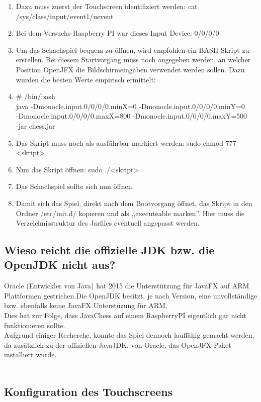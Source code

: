\documentclass[12pt,a4paper]{article}
\begin{document}
{\begin{enumerate}
	\item{Dazu muss zuerst der Touchscreen identifiziert werden: cat /sys/class/input/event1/uevent}
	\item{Bei dem Versuchs-Raspberry PI war dieses Input Device: 0/0/0/0}
	\item{Um das Schachspiel bequem zu öffnen, wird empfohlen ein BASH-Skript zu erstellen. Bei diesem Startvorgang muss noch angegeben werden, an welcher Position OpenJFX die Bildschirmeingaben verwendet werden sollen. Dazu wurden die besten Werte empirisch ermittelt:}
	\item{\# /bin/bash \\
	java -Dmonocle.input.0/0/0/0.minX=0 -Dmonocle.input.0/0/0/0.minY=0 \\
	-Dmonocle.input.0/0/0/0.maxX=800 -Dmonocle.input.0/0/0/0.maxY=500 \\
	-jar chess.jar
	}
	\item{Das Skript muss noch als ausführbar markiert werden: sudo chmod 777 <skript>}
	\item{Nun das Skript öffnen: sudo ./<skript>}
	\item{Das Schachspiel sollte sich nun öffnen.}
	\item{Damit sich das Spiel, direkt nach dem Bootvorgang öffnet, das Skript in den Ordner /etc/init.d/ kopieren und als ,,executeable marken''. Hier muss die Verzeichnisstruktur des Jarfiles eventuell angepasst werden.}
\end{enumerate}

\newpage
\subsection{Wieso reicht die offizielle JDK bzw. die OpenJDK nicht aus?}

Oracle (Entwickler von Java) hat 2015 die Unterstützung für JavaFX auf \ac{ARM} Plattformen gestrichen.Die OpenJDK besitzt, je nach Version, eine unvollständige bzw. ebenfalls keine JavaFX Unterstüzung für ARM. \\
Dies hat zur Folge, dass JavaChess auf einem RaspberryPI eigentlich gar nicht funktionieren sollte. \\
Aufgrund einiger Recherche, konnte das Spiel dennoch lauffähig gemacht werden, da zusätzlich zu der offiziellen JavaJDK, von Oracle, das OpenJFX Paket installiert wurde. \\
 \\


\subsection{Konfiguration des Touchscreens}

}
\end{document}
